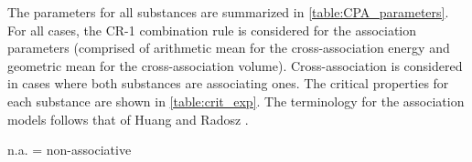 \documentclass[preprint,12pt,3p]{elsarticle}
\begin{document}
The parameters for all substances are summarized in \cref{table:CPA_parameters}.
For all cases, the \mbox{CR-1} combination rule is considered for the association parameters (comprised of arithmetic mean for the cross-association energy and geometric mean for the cross-association volume).
Cross-association is considered in cases where both substances are associating ones.
The critical properties for each substance are shown in \cref{table:crit_exp}.
The terminology for the association models follows that of Huang and Radosz \cite{huang1990equation}.

\begin{table}[h!]
\centering
\caption{Parameters of the CPA equation of state used in this work.}
\label{table:CPA_parameters}
\raggedright n.a.
= non-associative
\end{table}

\begin{table}[h!]
\centering
\caption{Experimental critical data obtained from NIST database \cite{nistfluids} and used as reference}
\label{table:crit_exp}
\end{table}
\end{document}
